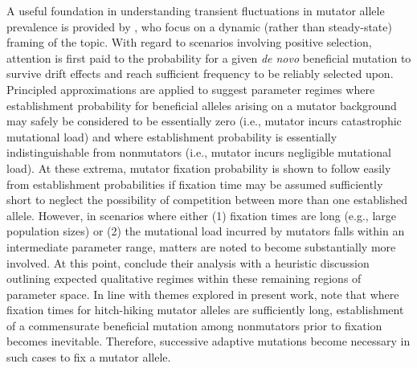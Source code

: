 A useful foundation in understanding transient fluctuations in mutator allele prevalence is provided by \citet{desai2011balance}, who focus on a dynamic (rather than steady-state) framing of the topic.
With regard to scenarios involving positive selection, attention is first paid to the probability for a given \textit{de novo} beneficial mutation to survive drift effects and reach sufficient frequency to be reliably selected upon.
Principled approximations are applied to suggest parameter regimes where establishment probability for beneficial alleles arising on a mutator background may safely be considered to be essentially zero (i.e., mutator incurs catastrophic mutational load) and where establishment probability is essentially indistinguishable from nonmutators (i.e., mutator incurs negligible mutational load).
At these extrema, mutator fixation probability is shown to follow easily from establishment probabilities if fixation time may be assumed sufficiently short to neglect the possibility of competition between more than one established allele.
However, in scenarios where either (1) fixation times are long (e.g., large population sizes) or (2) the mutational load incurred by mutators falls within an intermediate parameter range, matters are noted to become substantially more involved.
At this point, \citet{desai2011balance} conclude their analysis with a heuristic discussion outlining expected qualitative regimes within these remaining regions of parameter space.
In line with themes explored in present work, \citet{desai2011balance} note that where fixation times for hitch-hiking mutator alleles are sufficiently long, establishment of a commensurate beneficial mutation among nonmutators prior to fixation becomes inevitable.
Therefore, successive adaptive mutations become necessary in such cases to fix a mutator allele.

